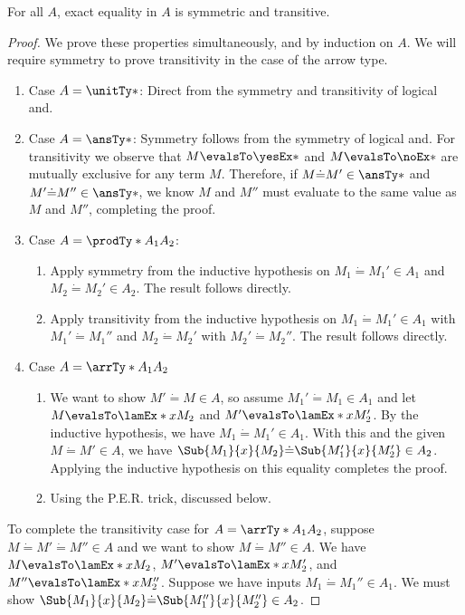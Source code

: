 \documentclass[letterpaper]{article}
\begin{document}
\begin{lemma}
    For all $A$, exact equality in $A$ is symmetric and transitive. 
\end{lemma}
\begin{proof}
We prove these properties simultaneously, and by induction on $A$. We will require symmetry to prove transitivity in the case of the arrow type. 

\begin{enumerate}
    \item Case $A = \unitTy*$: Direct from the symmetry and transitivity of logical and.
    \item Case $A = \ansTy*$: Symmetry follows from the symmetry of logical and. For transitivity we observe that $M \evalsTo \yesEx*$ and $M \evalsTo \noEx*$
    are mutually exclusive for any term $M$. Therefore, if $M \dot{=} M' \in \ansTy*$ and $M' \dot{=} M'' \in \ansTy*$, we know $M$ and $M''$ must evaluate to
    the same value as $M$ and $M''$, completing the proof.
    \item Case $A = \prodTy*{A_1}{A_2}$: 
    \begin{enumerate}
        \item Apply symmetry from the inductive hypothesis on $M_1 \dot{=} M_1' \in A_1$ and $M_2 \dot{=} M_2' \in A_2$. The result follows directly.
        \item Apply transitivity from the inductive hypothesis on $M_1 \dot{=} M_1' \in A_1$ with $M_1' \dot{=} M_1''$ and $M_2 \dot{=} M_2'$ with $M_2' \dot{=} M_2''$.
        The result follows directly.
    \end{enumerate}
    \item Case $A = \arrTy*{A_1}{A_2}$
    \begin{enumerate}
        \item We want to show $M' \dot{=} M \in A$, so assume $M_1' \dot{=} M_1 \in A_1$ and let $M \evalsTo \lamEx*{x}{M_2}$ and $M' \evalsTo \lamEx*{x}{M_2'}$. 
        By the inductive hypothesis, we have $M_1 \dot{=} M_1' \in A_1$. With this and the given $M \dot{=} M' \in A$,
        we have $\Sub{M_1}{x}{M_2} \dot{=} \Sub{M_1'}{x}{M_2'} \in A_2$. Applying the inductive hypothesis on this equality completes the proof. 
        \item Using the P.E.R. trick, discussed below.
    \end{enumerate}
\end{enumerate}

To complete the transitivity case for $A = \arrTy*{A_1}{A_2}$, suppose $M \dot{=} M' \dot{=} M'' \in A$ and we want to show $M \dot{=} M'' \in A$. 
We have $M \evalsTo \lamEx*{x}{M_2}$, $M' \evalsTo \lamEx*{x}{M_2'}$, and $M'' \evalsTo \lamEx*{x}{M_2''}$. Suppose we have inputs $M_1 \dot{=} M_1'' \in A_1$. 
We must show $\Sub{M_1}{x}{M_2} \dot{=} \Sub{M_1''}{x}{M_2''} \in A_2$.


\end{proof}
\end{document}
